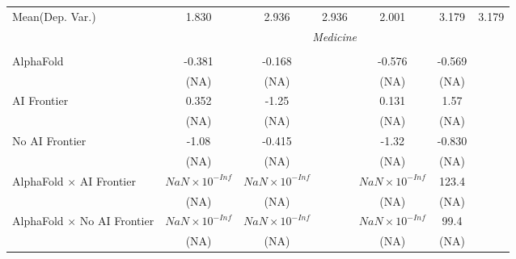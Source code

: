 \begin{tabular}{lcccccc}
Mean(Dep. Var.) & 1.830 & 2.936 & 2.936 & 2.001 & 3.179 & 3.179 \\
 & \multicolumn{6}{c}{\textit{Medicine}} \\ \\
   AlphaFold                                                                  & -0.381                 & -0.168                 &                        & -0.576                 & -0.569 &   \\   
                                                                              & (NA)                   & (NA)                   &                        & (NA)                   & (NA)   &   \\   
   AI Frontier                                                                & 0.352                  & -1.25                  &                        & 0.131                  & 1.57   &   \\   
                                                                              & (NA)                   & (NA)                   &                        & (NA)                   & (NA)   &   \\   
   No AI Frontier                                                             & -1.08                  & -0.415                 &                        & -1.32                  & -0.830 &   \\   
                                                                              & (NA)                   & (NA)                   &                        & (NA)                   & (NA)   &   \\   
   AlphaFold $\times$ AI Frontier                                             & $NaN\times 10^{-Inf}$  & $NaN\times 10^{-Inf}$  &                        & $NaN\times 10^{-Inf}$  & 123.4  &   \\   
                                                                              & (NA)                   & (NA)                   &                        & (NA)                   & (NA)   &   \\   
   AlphaFold $\times$ No AI Frontier                                          & $NaN\times 10^{-Inf}$  & $NaN\times 10^{-Inf}$  &                        & $NaN\times 10^{-Inf}$  & 99.4   &   \\   
                                                                              & (NA)                   & (NA)                   &                        & (NA)                   & (NA)   &   \\   

\end{tabular}

